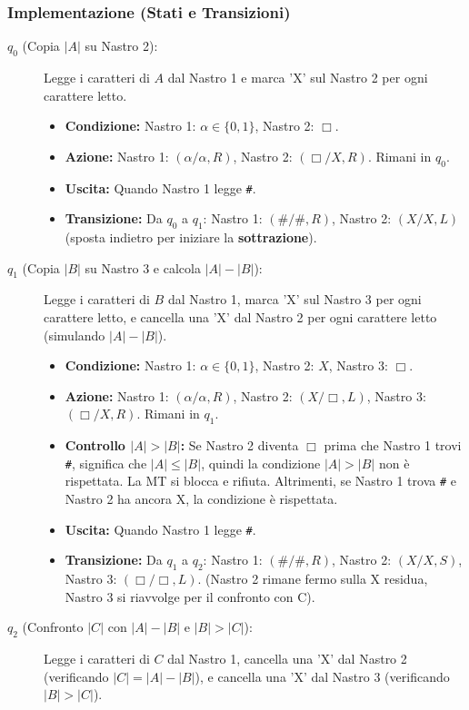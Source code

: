 \documentclass[a4paper, 11pt]{book} %
\theoremstyle{definition}
\begin{document}
\subsubsection{Implementazione (Stati e Transizioni)}
\begin{description}
    \item[$q_0$ (Copia $|A|$ su Nastro 2):] Legge i caratteri di $A$ dal Nastro 1 e marca 'X' sul Nastro 2 per ogni carattere letto.
    \begin{itemize}
        \item \textbf{Condizione:} Nastro 1: $\alpha \in \{0,1\}$, Nastro 2: $\Box$.
        \item \textbf{Azione:} Nastro 1: $(\alpha/\alpha, R)$, Nastro 2: $(\Box/X, R)$. Rimani in $q_0$.
        \item \textbf{Uscita:} Quando Nastro 1 legge \texttt{\#}.
        \item \textbf{Transizione:} Da $q_0$ a $q_1$: Nastro 1: $(\texttt{\#}/\texttt{\#}, R)$, Nastro 2: $(X/X, L)$ (sposta indietro per iniziare la \textbf{sottrazione}).
    \end{itemize}
    \item[$q_1$ (Copia $|B|$ su Nastro 3 e calcola $|A|-|B|$):] Legge i caratteri di $B$ dal Nastro 1, marca 'X' sul Nastro 3 per ogni carattere letto, e cancella una 'X' dal Nastro 2 per ogni carattere letto (simulando $|A|-|B|$).
    \begin{itemize}
        \item \textbf{Condizione:} Nastro 1: $\alpha \in \{0,1\}$, Nastro 2: $X$, Nastro 3: $\Box$.
        \item \textbf{Azione:} Nastro 1: $(\alpha/\alpha, R)$, Nastro 2: $(X/\Box, L)$, Nastro 3: $(\Box/X, R)$. Rimani in $q_1$.
        \item \textbf{Controllo $|A|>|B|$:} Se Nastro 2 diventa $\Box$ prima che Nastro 1 trovi \texttt{\#}, significa che $|A| \le |B|$, quindi la condizione $|A|>|B|$ non è rispettata. La MT si blocca e rifiuta. Altrimenti, se Nastro 1 trova \texttt{\#} e Nastro 2 ha ancora X, la condizione è rispettata.
        \item \textbf{Uscita:} Quando Nastro 1 legge \texttt{\#}.
        \item \textbf{Transizione:} Da $q_1$ a $q_2$: Nastro 1: $(\texttt{\#}/\texttt{\#}, R)$, Nastro 2: $(X/X, S)$, Nastro 3: $(\Box/\Box, L)$. (Nastro 2 rimane fermo sulla X residua, Nastro 3 si riavvolge per il confronto con C).
    \end{itemize}
    \item[$q_2$ (Confronto $|C|$ con $|A|-|B|$ e $|B|>|C|$):] Legge i caratteri di $C$ dal Nastro 1, cancella una 'X' dal Nastro 2 (verificando $|C|=|A|-|B|$), e cancella una 'X' dal Nastro 3 (verificando $|B|>|C|$).

\end{description}
\end{document}
